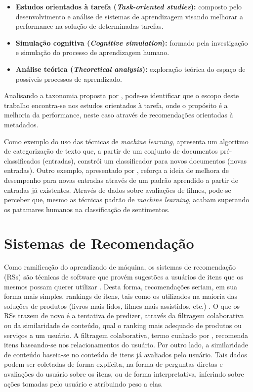 \documentclass[12pt, openright, oneside, a4paper, brazil]{abntex2}
\begin{document}
\begin{itemize}
	\item \textbf{Estudos orientados à tarefa (\textit{Task-oriented studies}):} composto pelo desenvolvimento e análise de sistemas de aprendizagem visando melhorar a performance na solução de determinadas tarefas.

	\item \textbf{Simulação cognitiva (\textit{Cognitive simulation}):} formado pela investigação e simulação do processo de aprendizagem humano.

	\item \textbf{Análise teórica (\textit{Theoretical analysis}):} exploração teórica do espaço de possíveis processos de aprendizado.
\end{itemize}

Analisando a taxonomia proposta por , pode-se identificar que o escopo deste trabalho encontra-se nos estudos orientados à tarefa, onde o propósito é a melhoria da performance, neste caso através de recomendações orientadas à metadados.

Como exemplo do uso das técnicas de \textit{machine learning},   apresenta um algoritmo de categorização de texto que, a partir de um conjunto de documentos pré-classificados (entradas), constrói um classificador para novos documentos (novas entradas). Outro exemplo, apresentado por , reforça a ideia de melhora de desempenho para novas entradas através de um padrão aprendido a partir de entradas já existentes. Através de dados sobre avaliações de filmes, pode-se perceber que, mesmo as técnicas padrão de \textit{machine learning}, acabam superando os patamares humanos na classificação de sentimentos.

\section{Sistemas de Recomendação} \label{recommender_systems}

Como ramificação do aprendizado de máquina, os sistemas de recomendação (RSs) são técnicas de software que provém sugestões a usuários de itens que os mesmos possam querer utilizar \cite{resnick1997recommender, schafer1999recommender}. Desta forma, recomendações seriam, em sua forma mais simples, rankings de itens, tais como os utilizados na maioria das soluções de produtos (livros mais lidos, filmes mais assistidos, etc.) \cite{ricci2011introduction}. O que os RSs trazem de novo é a tentativa de predizer, através da filtragem colaborativa ou da similaridade de conteúdo, qual o ranking mais adequado de produtos ou serviços a um usuário. A filtragem colaborativa, termo cunhado por , recomenda itens baseando-se nos relacionamentos do usuário. Por outro lado, a similaridade de conteúdo baseia-se no conteúdo de itens já avaliados pelo usuário. Tais dados podem ser coletadas de forma explícita, na forma de perguntas diretas e avaliações do usuário sobre os itens, ou de forma interpretativa, inferindo sobre ações tomadas pelo usuário e atribuindo peso a elas.
\end{document}
